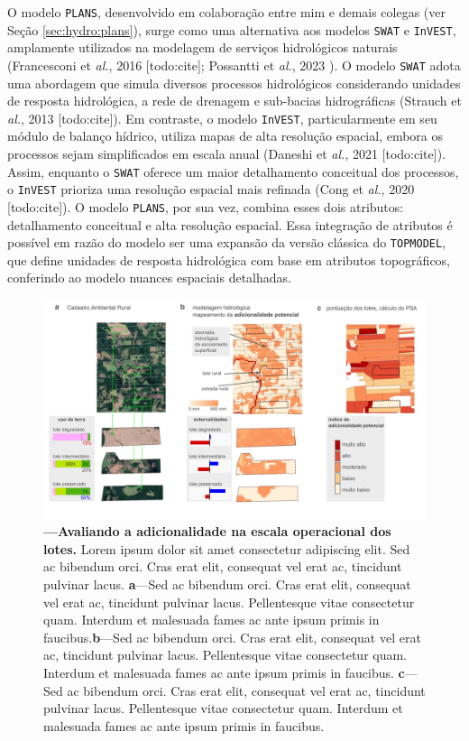 \documentclass[./main.tex]{subfiles}
\begin{document}
\par O modelo \texttt{PLANS}, desenvolvido em colaboração entre mim e demais colegas (ver Seção \ref{sec:hydro:plans}), surge como uma alternativa aos modelos \texttt{SWAT} e \texttt{InVEST}, amplamente utilizados na modelagem de serviços hidrológicos naturais (Francesconi et \textit{al.}, 2016 [todo:cite]; Possantti et \textit{al.}, 2023 \cite{Possantti2023a}). O modelo \texttt{SWAT} adota uma abordagem que simula diversos processos hidrológicos considerando unidades de resposta hidrológica, a rede de drenagem e sub-bacias hidrográficas (Strauch et \textit{al.}, 2013 [todo:cite]). Em contraste, o modelo \texttt{InVEST}, particularmente em seu módulo de balanço hídrico, utiliza mapas de alta resolução espacial, embora os processos sejam simplificados em escala anual (Daneshi et \textit{al.}, 2021 [todo:cite]). Assim, enquanto o \texttt{SWAT} oferece um maior detalhamento conceitual dos processos, o \texttt{InVEST} prioriza uma resolução espacial mais refinada (Cong et \textit{al.}, 2020 [todo:cite]). O modelo \texttt{PLANS}, por sua vez, combina esses dois atributos: detalhamento conceitual e alta resolução espacial. Essa integração de atributos é possível em razão do modelo ser uma expansão da versão clássica do \texttt{TOPMODEL}, que define unidades de resposta hidrológica com base em atributos topográficos, conferindo ao modelo nuances espaciais detalhadas.

\begin{figure}[t!] 
\centering				
\includegraphics[width=0.98\linewidth]{figs/fig_lotscale.jpg}		
\caption[Lorem ipsum dolor sit amet]
{\textbf{---\;Avaliando a adicionalidade na escala operacional dos lotes.}
    Lorem ipsum dolor sit amet consectetur adipiscing elit. Sed ac bibendum orci. Cras erat elit, consequat vel erat ac, tincidunt pulvinar lacus. \;\textbf{a}\;---\;Sed ac bibendum orci. Cras erat elit, consequat vel erat ac, tincidunt pulvinar lacus. Pellentesque vitae consectetur quam. Interdum et malesuada fames ac ante ipsum primis in faucibus.\;\textbf{b}\;---\;Sed ac bibendum orci. Cras erat elit, consequat vel erat ac, tincidunt pulvinar lacus. Pellentesque vitae consectetur quam. Interdum et malesuada fames ac ante ipsum primis in faucibus. \;\textbf{c}\;---\;Sed ac bibendum orci. Cras erat elit, consequat vel erat ac, tincidunt pulvinar lacus. Pellentesque vitae consectetur quam. Interdum et malesuada fames ac ante ipsum primis in faucibus.
}
\label{fig:eco:addplans2} 		
\end{figure}
\end{document}
